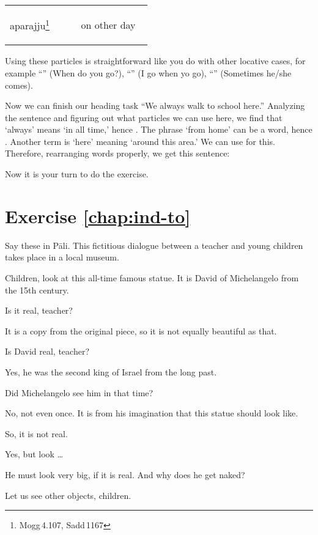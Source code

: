 \begin{longtable}[c]{@{}%
	>{\itshape\raggedright\arraybackslash}p{0.45\linewidth}%
	>{\raggedright\arraybackslash}p{0.45\linewidth}@{}}
aparajju\footnote{Mogg\,4.107, Sadd\,1167} & on other day \\
\end{longtable}

Using these particles is straightforward like you do with other locative cases, for example ``'' (When do you go?), ``'' (I go when yo go), ``'' (Sometimes he/she comes).

Now we can finish our heading task ``We always walk to school here.'' Analyzing the sentence and figuring out what particles we can use here, we find that `always' means `in all time,' hence . The phrase `from home' can be a  word, hence . Another term is `here' meaning `around this area.' We can use  for this. Therefore, rearranging words properly, we get this sentence:


Now it is your turn to do the exercise.

\section*{Exercise \ref{chap:ind-to}}
Say these in P\=ali. This fictitious dialogue between a teacher and young children takes place in a local museum.
\begin{compactenum}
\item Children, look at this all-time famous statue. It is David of Michelangelo from the 15th century.
\item Is it real, teacher?
\item It is a copy from the original piece, so it is not equally beautiful as that.
\item Is David real, teacher?
\item Yes, he was the second king of Israel from the long past.
\item Did Michelangelo see him in that time?
\item No, not even once. It is from his imagination that this statue should look like.
\item So, it is not real.
\item Yes, but look \ldots
\item He must look very big, if it is real. And why does he get naked?
\item Let us see other objects, children.
\end{compactenum}
